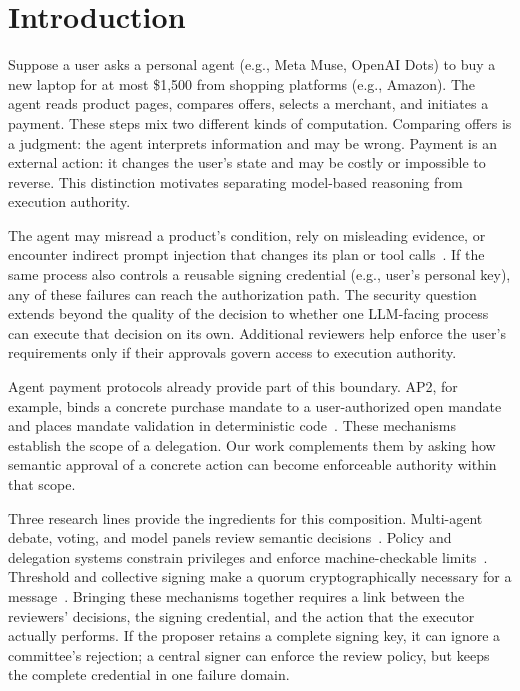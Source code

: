 \documentclass{article}
\begin{document}
\section{Introduction}
Suppose a user asks a personal agent (e.g., Meta Muse, OpenAI Dots) to buy a new laptop for at most
\$1,500 from shopping platforms (e.g., Amazon). The agent reads product pages, compares offers, selects a merchant,
and initiates a payment. These steps mix two different kinds of computation.
Comparing offers is a judgment: the agent interprets information and may be
wrong. Payment is an external action: it changes the user's state and may be
costly or impossible to reverse. This distinction motivates separating
model-based reasoning from execution authority.

The agent may misread a product's condition, rely on misleading evidence, or
encounter indirect prompt injection that changes its plan or tool
calls~\citep{zhan2024injecagent,debenedetti2024agentdojo}. If the same process
also controls a reusable signing credential (e.g., user's personal key), any of these failures can reach
the authorization path. The security question extends beyond the quality of
the decision to whether one LLM-facing process can execute that decision on
its own. Additional reviewers help enforce the user's requirements only if
their approvals govern access to execution authority.

Agent payment protocols already provide part of this boundary. AP2, for
example, binds a concrete purchase mandate to a user-authorized open mandate
and places mandate validation in deterministic code~\citep{ap2}. These
mechanisms establish the scope of a delegation. Our work complements them
by asking how semantic approval of a concrete action can become enforceable
authority within that scope.

\begin{samepage}
Three research lines provide the ingredients for this composition.
Multi-agent debate, voting, and model panels review semantic
decisions~\citep{du2024debate,verga2024juries,choi2025debate}. Policy and
delegation systems constrain privileges and enforce machine-checkable
limits~\citep{debenedetti2025camel,shi2025progent,south2025delegation,muruaga2026bounded}.
Threshold and collective signing make a quorum cryptographically necessary
for a message~\citep{borselius2002,syta2016cosi}. Bringing these mechanisms
together requires a link between the reviewers' decisions, the signing
credential, and the action that the executor actually performs. If the
proposer retains a complete signing key, it can ignore a committee's
rejection; a central signer can enforce the review policy, but keeps the
complete credential in one failure domain.
\end{samepage}
\end{document}
